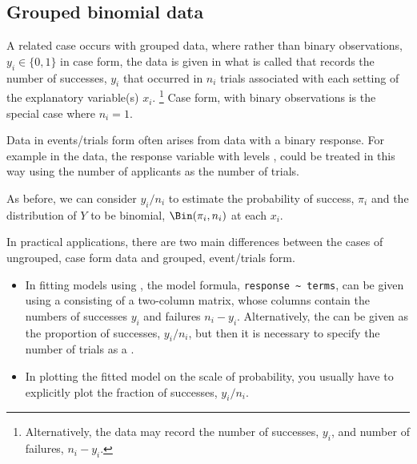 \documentclass[11pt]{book}
\begin{document}
\subsection{Grouped binomial data}\label{sec:logist-grouped}
A related case occurs with grouped data, where rather than binary observations,
$y_i \in \{0, 1\}$ in case form, 
the data is given in what is called
 that 
records the number of successes, $y_i$ that
occurred in $n_i$ trials associated with each setting of the explanatory
variable(s) $x_i$.%
\footnote{
Alternatively, the data may record the number of
successes, $y_i$, and number of failures, $n_i - y_i$.
}
Case form, with binary observations is the special case where $n_i=1$.

Data in events/trials form often arises from \ctab data with a
binary response. For example in the  data,
the response variable  with levels ,
 could be treated in this way using
the number of applicants as the number of trials.

As before, we can consider $y_i/n_i$ to estimate the probability of success, $\pi_i$
and the distribution of $Y$ to be binomial, $\Bin(\pi_i, n_i)$ at each $x_i$.

In practical applications, there are two main differences between the 
cases of ungrouped, case form data and grouped, event/trials form.

\begin{itemize}

 \item In fitting models using , the model formula, \verb|response ~ terms|, 
 can be given 
 using a  consisting of a 
 two-column matrix, whose columns contain the numbers of successes $y_i$ 
 and failures $n_i - y_i$.
 Alternatively, the  can be given as the proportion of successes,
 $y_i / n_i$, but then it is necessary to specify the number of trials as a
 .
 
 \item In plotting the fitted model on the scale of probability, you usually
 have to explicitly plot the fraction of successes, $y_i/n_i$.

\end{itemize}
\end{document}
